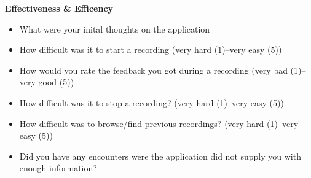 \noindent \textbf{Effectiveness \& Efficency}
\begin{itemize}
    \item What were your inital thoughts on the application
    
    

    \item How difficult was it to start a recording (very hard (1)--very easy (5))
    

    \item How would you rate the feedback you got during a recording (very bad (1)--very good (5))

    \item How difficult was it to stop a recording? (very hard (1)--very easy (5))
    \item How difficult was to browse/find previous recordings? (very hard (1)--very easy (5))
    \item Did you have any encounters were the application did not supply you with enough information?
    \begin{description}[font=\normalfont\itshape]
        \item[Participent A:]
        \item[Participent B:] 
    \end{description}
\end{itemize}

